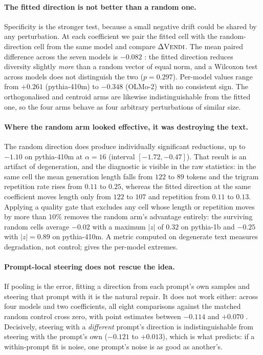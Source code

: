 \paragraph{The fitted direction is not better than a random one.}
Specificity is the stronger test, because a small negative drift could be shared by any perturbation.
At each coefficient we pair the fitted cell with the random-direction cell from the same model and
compare $\Delta\textsc{Vendi}$. The mean paired difference across the seven models is $-0.082$ \vendi{}: the fitted
direction reduces diversity slightly \emph{more} than a random vector of equal norm, and a Wilcoxon
test across models does not distinguish the two ($p = 0.297$). Per-model values range from $+0.261$
(pythia-410m) to $-0.348$ (OLMo-2) with no consistent sign. The orthogonalised and centroid arms are likewise
indistinguishable from the fitted one, so the four arms behave as four arbitrary perturbations of
similar size.

\paragraph{Where the random arm looked effective, it was destroying the text.}
The random direction does produce individually significant reductions, up to $-1.10$ \vendi{} on
pythia-410m at $\alpha=16$ (interval $[-1.72,-0.47]$). That result is an artifact of degeneration,
and the diagnostic is visible in the raw statistics: in the same cell the mean generation length
falls from $122$ to $89$ tokens and the trigram repetition rate rises from $0.11$ to $0.25$, whereas
the fitted direction at the same coefficient moves length only from $122$ to $107$ and repetition
from $0.11$ to $0.13$. Applying a quality gate that excludes any cell whose length or repetition
moves by more than $10\%$ removes the random arm's advantage entirely: the surviving random cells
average $-0.02$ \vendi{} with a maximum $|z|$ of $0.32$ on pythia-1b and $-0.25$ with $|z|=0.89$ on
pythia-410m. A metric computed on degenerate text measures degradation, not control; 
gives the per-model extremes.

\paragraph{Prompt-local steering does not rescue the idea.}
If pooling is the error, fitting a direction from each prompt's own samples and steering that prompt
with it is the natural repair. It does not work either: across four models and two coefficients, all
eight comparisons against the matched random control cross zero, with point estimates between
$-0.114$ and $+0.070$ \vendi{}. Decisively, steering with a \emph{different} prompt's direction is
indistinguishable from steering with the prompt's own ($-0.121$ to $+0.013$), which is what
 predicts: if a within-prompt fit is noise, one prompt's noise is as good as
another's.
